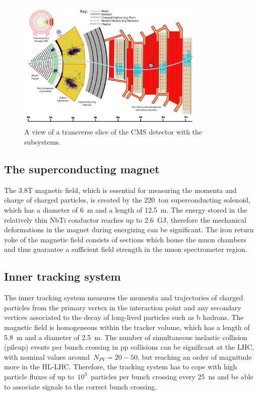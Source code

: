 \begin{figure}
\begin{centering}
\includegraphics[width=0.8\textwidth]{figures/exp/cms_slice.pdf}
\caption{A view of a transverse slice of the CMS detector with the subsystems.}
\label{fig:cms_slice}
\end{centering}
\end{figure}

\subsection{The superconducting magnet}
The 3.8T magnetic field, which is essential for measuring the momenta and charge of charged particles, is created by the 220~ton superconducting solenoid, which has a diameter of 6~m and a length of 12.5~m. The energy stored in the relatively thin NbTi conductor reaches up to 2.6~GJ, therefore the mechanical deformations in the magnet during energizing can be significant. The iron return yoke of the magnetic field consists of sections which house the muon chambers and thus guarantee a sufficient field strength in the muon spectrometer region.

\subsection{Inner tracking system}
The inner tracking system measures the momenta and trajectories of charged particles from the primary vertex in the interaction point and any secondary vertices associated to the decay of long-lived particles such as b hadrons. The magnetic field is homogeneous within the tracker volume, which has a length of 5.8~m and a diameter of 2.5~m. The number of simultaneous inelastic collision (pileup) events per bunch crossing in pp collisions can be significant at the LHC, with nominal values around~$N_{PV} = 20-50$, but reaching an order of magnitude more in the HL-LHC. Therefore, the tracking system has to cope with high particle fluxes of up to~$10^3$~particles per bunch crossing every 25~ns and be able to associate signals to the correct bunch crossing.

